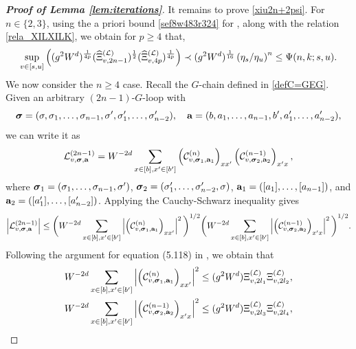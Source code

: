 \begin{proof}[\bf Proof of Lemma \ref{lem:iterations}]
It remains to prove \eqref{xiu2n+2psi}. For $n\in\{2,3\}$, using the a priori bound \eqref{sef8w483r324} for , along with the relation \eqref{rela_XILXILK}, we obtain for $p\ge 4$ that,
\begin{align*} 
\sup_{v\in[s,u]}\left((g^2W^d)^{\frac{1}{4p}}(\widehat\Xi^{(\mathcal L)}_{v, {2n-1}})^{\frac 1 2}(\widehat\Xi^{(\mathcal L)}_{v, 4p})^{\frac{1}{4p}}\right)  \prec (g^2W^d)^{\frac{1}{16}}\left( {\eta_s}/{\eta_u}\right)^{n}  \le \Psi(n,k;s,u).
\end{align*} 
We now consider the $n\ge 4$ case. Recall the $G$-chain defined in \eqref{defC=GEG}. Given an arbitrary $(2n-1)$-$G$-loop  with 
$${\boldsymbol{\sigma}}=(\sigma,\sigma_1,\ldots, \sigma_{n-1}, \sigma',\sigma_1',\ldots, \sigma_{n-2}'),\quad {\mathbf{a}}=(b,a_1,\ldots,a_{n-1},b',a_1',\ldots,a_{n-2}'),$$ 
we can write it as 
\begin{align*}
\mathcal L^{(2n-1)}_{v,{\boldsymbol{\sigma}},{\mathbf{a}}}=W^{-2d}\sum_{x\in[b],x'\in [b']} \left(\mathcal C^{(n)}_{v,{\boldsymbol{\sigma}}_1,{\mathbf{a}}_1}\right)_{xx'} \left(\mathcal C^{(n-1)}_{v,{\boldsymbol{\sigma}}_2,{\mathbf{a}}_2}\right)_{x'x} ,  
\end{align*}
where ${\boldsymbol{\sigma}}_1=(\sigma_1,\ldots, \sigma_{n-1}, \sigma')$, ${\boldsymbol{\sigma}}_2=(\sigma_1',\ldots, \sigma_{n-2}',\sigma)$, ${\mathbf{a}}_1=([a_1],\ldots,[a_{n-1}])$, and ${\mathbf{a}}_2=([a_1'],\ldots,[a_{n-2}'])$. Applying the Cauchy-Schwarz inequality gives
\begin{equation}\label{suauwiioo1}
\left|\mathcal L^{(2n-1)}_{v,{\boldsymbol{\sigma}},{\mathbf{a}}}\right|
\le 
\bigg( W^{-2d}\sum_{x\in[b],x'\in[b']}
\left|\left({\mathcal C}^{(n)} _{v,{\boldsymbol{\sigma}}_1,{\mathbf{a}}_1}\right)_{xx'} 
\right|^2 \bigg)^{1/2}\bigg( W^{-2d}\sum_{x\in[b],x'\in[b']}
\left|\left({\mathcal C}^{(n-1)} _{v,{\boldsymbol{\sigma}}_2,{\mathbf{a}}_2}\right)_{x'x} 
\right|^2 \bigg)^{1/2}.
\end{equation}
Following the argument for equation (5.118) in \cite{YY_25}, we obtain that 
\begin{equation}\label{eq:boundtwochains}
    \begin{split}
& W^{-2d}\sum_{x\in[b],x'\in[b']}
\left|\left({\cal C}^{(n)} _{v,\bsig_1,\ba_1}\right)_{xx'} 
\right|^2 \le (\ilambda^2W^d) \Xi^{(\cL)}_{v,2l_1}\Xi^{(\cL)}_{v,2l_2}, \\  &W^{-2d}\sum_{x\in[b],x'\in[b']}
\left|\left({\cal C}^{(n-1)} _{v,\bsig_2,\ba_2}\right)_{x'x} 
\right|^2 \le (\ilambda^2W^d) \Xi^{(\cL)}_{v,2l_3}\Xi^{(\cL)}_{v,2l_4},

\end{split}
\end{equation}
\end{proof}
